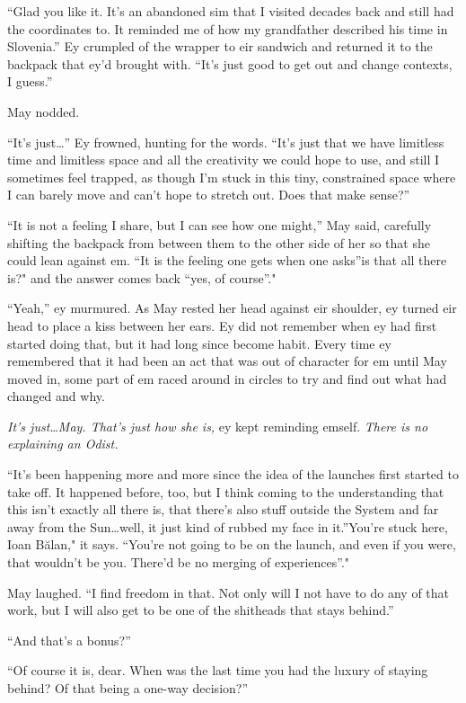 ``Glad you like it. It's an abandoned sim that I visited decades back and still had the coordinates to. It reminded me of how my grandfather described his time in Slovenia.'' Ey crumpled of the wrapper to eir sandwich and returned it to the backpack that ey'd brought with. ``It's just good to get out and change contexts, I guess.''

May nodded.

``It's just\ldots{}'' Ey frowned, hunting for the words. ``It's just that we have limitless time and limitless space and all the creativity we could hope to use, and still I sometimes feel trapped, as though I'm stuck in this tiny, constrained space where I can barely move and can't hope to stretch out. Does that make sense?''

``It is not a feeling I share, but I can see how one might,'' May said, carefully shifting the backpack from between them to the other side of her so that she could lean against em. ``It is the feeling one gets when one asks''is that all there is?" and the answer comes back ``yes, of course''."

``Yeah,'' ey murmured. As May rested her head against eir shoulder, ey turned eir head to place a kiss between her ears. Ey did not remember when ey had first started doing that, but it had long since become habit. Every time ey remembered that it had been an act that was out of character for em until May moved in, some part of em raced around in circles to try and find out what had changed and why.

\emph{It's just\ldots May. That's just how she is,} ey kept reminding emself. \emph{There is no explaining an Odist.}

``It's been happening more and more since the idea of the launches first started to take off. It happened before, too, but I think coming to the understanding that this isn't exactly all there is, that there's also stuff outside the System and far away from the Sun\ldots well, it just kind of rubbed my face in it.''You're stuck here, Ioan Bălan," it says. ``You're not going to be on the launch, and even if you were, that wouldn't be you. There'd be no merging of experiences''."

May laughed. ``I find freedom in that. Not only will I not have to do any of that work, but I will also get to be one of the shitheads that stays behind.''

``And that's a bonus?''

``Of course it is, dear. When was the last time you had the luxury of staying behind? Of that being a one-way decision?''

